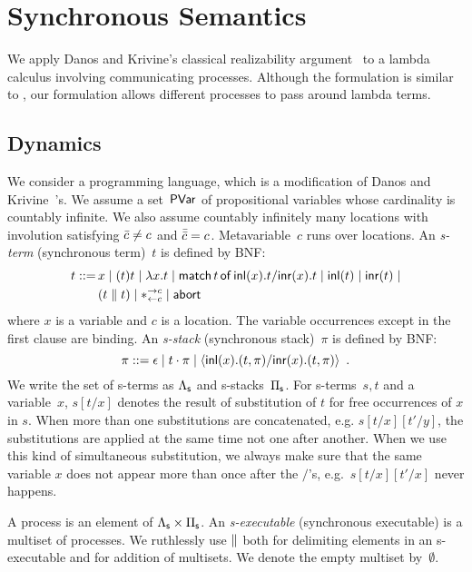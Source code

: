 \section{Synchronous Semantics}
\label{sec:sync}

We apply Danos and Krivine's classical realizability
argument~\citep{danos-krivine} to a
lambda calculus involving
communicating processes.  Although the formulation is similar to
\citep{danos-krivine}, our formulation allows different processes to
pass around lambda terms.

\subsection{Dynamics}
We consider a programming language, which is a modification of
Danos and Krivine~\citep{danos-krivine}'s.
We assume a set~$\mathsf{PVar}$ of propositional variables whose cardinality is
countably infinite.
We also assume countably infinitely many locations with involution
satisfying $\bar{c}\neq c$ and $\bar{\bar{c}} = c$.
Metavariable~$c$ runs over locations.
An \textit{s-term} (synchronous term)~$t$ is defined by BNF:
\begin{align*}
 t::= \,&x
 \mid (t)t
 \mid \lambda x.t
 \mid \mathsf{match}\,{t}\,\mathsf{of}\, \mathsf{inl}({x}). {t}/ \mathsf{inr}({x}). {t}
 \mid \mathsf{inl}({t})
 \mid \mathsf{inr}({t})
 \mid \\ &
 (t\parallel t)
 \mid \ast^{\rightarrow {c}}_{\leftarrow{c}}
 \mid \mathsf{abort\,}
\end{align*}
where $x$ is a variable and $c$ is a location.  The variable occurrences
except in the first clause are binding.
An \textit{s-stack} (synchronous stack)~$\pi$ is
defined by BNF:
\[
 \pi ::= \epsilon
 \mid t\cdot \pi
 \mid \langle \mathsf{inl}({x}). ({t},{\pi})/ \mathsf{inr}({x}). ({t},{\pi})\rangle
 \enspace.
\]
We write the set of s-terms as $\Lambda_{\mathsf s}$ and s-stacks~$\Pi_{\mathsf s}$.
For s-terms~$s,t$ and a variable~$x$, $s[t/x]$ denotes the result of
substitution of $t$ for free occurrences of $x$ in $s$.  When more than one
substitutions are concatenated, e.g. $s[t/x][t'/y]$, the substitutions
are applied at the same time not one after another.
When we use this
kind of simultaneous substitution, we always make sure that the same
variable $x$ does not appear more than once after the $/$'s,
e.g.~$s[t/x][t'/x]$ never happens.

A process is an element of $\Lambda_{\mathsf s}\times\Pi_{\mathsf s}$.
An \textit{s-executable} (synchronous executable)
is a multiset of processes.
We ruthlessly use $\parallel$ both for delimiting elements in an
s-executable and for addition of multisets.
We denote the empty multiset by~$\emptyset$.

